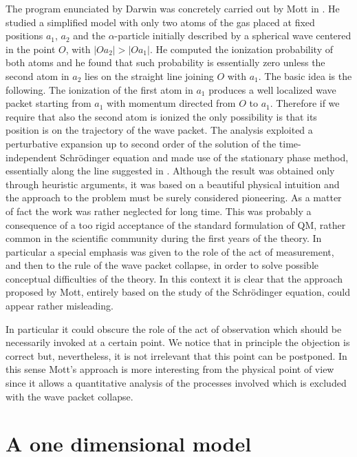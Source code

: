 \documentclass[12pt,reqno]{amsart}
\newcommand{\n}{\relax}
\newcommand{\vs}{\medskip}
\numberwithin{equation}{section}
\begin{document}
\n
The program enunciated by Darwin was concretely carried out by Mott in \cite{m}. He studied a simplified model with only two atoms of the gas placed at fixed positions $a_1$, $a_2$  and the $\alpha$-particle initially described by a spherical wave centered in the point $O$, with $|Oa_2| >|Oa_1|$. He computed the ionization probability of both atoms  and he found that such probability is essentially zero unless the second atom in $a_2$ lies on the straight line joining $O$ with $a_1$.  The basic idea is the following.  The ionization of the first atom in $a_1$ produces a well localized wave packet starting from $a_1$ with momentum directed from $O$ to $a_1$. Therefore if we require that also the second atom is ionized the only possibility is that its position is on the trajectory of the wave packet.  
The analysis exploited a perturbative expansion up to second order of the solution of  the time-independent Schr\"{o}dinger equation and made use of the stationary phase method, essentially along the line suggested in \cite{d}. 
Although the result was obtained only through heuristic arguments,  it was based  on a beautiful physical intuition and the approach to the problem must be surely considered pioneering.  As a matter of fact the work was rather neglected for long time.  This was  probably a consequence of a too rigid acceptance of the standard formulation of QM, rather common in the scientific community during the first years of the theory.  In  particular a special emphasis   was given to the role of the act of measurement, and then to the rule of the wave packet collapse, in order to solve possible conceptual difficulties of the theory.  In this context it is clear that the approach proposed by Mott, entirely based on the study of the Schr\"{o}dinger equation,  could appear rather misleading.

\n
In particular it could obscure the role of the act of observation which should be necessarily invoked at a certain point. We notice that in principle the objection is correct but, nevertheless, it is not irrelevant that this point can be postponed. In this sense  Mott's approach is  more interesting from the physical point of view since it allows a quantitative analysis of the processes involved which is excluded with the wave packet collapse. 




\vs
\vs
\section{A one dimensional model}
\end{document}
